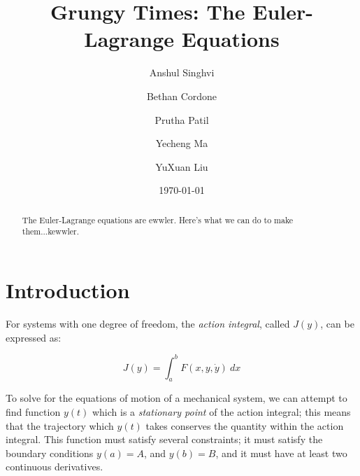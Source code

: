 \documentclass[%
 amsmath,amssymb,
aps,
 fleqn,
 notitlepage,
]{revtex4-2}
\begin{document}

\title{Grungy Times: The Euler-Lagrange Equations}

\author{Anshul Singhvi}
\author{Bethan Cordone}
\author{Prutha Patil}%
\author{Yecheng Ma}
\author{YuXuan Liu}

%

\date{\today}%

\begin{abstract}
    The Euler-Lagrange equations are ewwler.  Here's what we can do to make them...kewwler.
\end{abstract}

\maketitle

\linespread{1.3}

\section{Introduction}

For systems with one degree of freedom, the \emph{action integral}, called $J(y)$, can be expressed as:

\begin{equation}\label{eq: action}
    J(y) = \int_a^b F(x, y, \dot y) ~ dx
\end{equation}

To solve for the equations of motion of a mechanical system, we can attempt to find function $y(t)$ which is a \emph{stationary point} of the action integral; this means that the trajectory which $y(t)$ takes conserves the quantity within the action integral.  This function must satisfy several constraints; it must satisfy the boundary conditions $y(a) = A$, and $y(b) = B$, and it must have at least two continuous derivatives.
\end{document}
